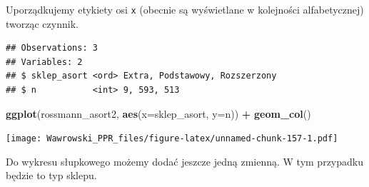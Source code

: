 \documentclass[]{book}
\newenvironment{Shaded}{\begin{snugshade}}{\end{snugshade}}
\newcommand{\KeywordTok}[1]{\textcolor[rgb]{0.13,0.29,0.53}{\textbf{#1}}}
\newcommand{\DataTypeTok}[1]{\textcolor[rgb]{0.13,0.29,0.53}{#1}}
\newcommand{\StringTok}[1]{\textcolor[rgb]{0.31,0.60,0.02}{#1}}
\newcommand{\OperatorTok}[1]{\textcolor[rgb]{0.81,0.36,0.00}{\textbf{#1}}}
\newcommand{\NormalTok}[1]{#1}
\begin{document}
Uporządkujemy etykiety osi \texttt{x} (obecnie są wyświetlane w
kolejności alfabetycznej) tworząc czynnik.

\begin{Shaded}
\end{Shaded}

\begin{verbatim}
## Observations: 3
## Variables: 2
## $ sklep_asort <ord> Extra, Podstawowy, Rozszerzony
## $ n           <int> 9, 593, 513
\end{verbatim}

\begin{Shaded}
\begin{Highlighting}[]
\KeywordTok{ggplot}\NormalTok{(rossmann_asort2, }\KeywordTok{aes}\NormalTok{(}\DataTypeTok{x=}\NormalTok{sklep_asort, }\DataTypeTok{y=}\NormalTok{n)) }\OperatorTok{+}
\StringTok{  }\KeywordTok{geom_col}\NormalTok{()}
\end{Highlighting}
\end{Shaded}

\texttt{[image: Wawrowski\_PPR\_files/figure-latex/unnamed-chunk-157-1.pdf]}

Do wykresu słupkowego możemy dodać jeszcze jedną zmienną. W tym
przypadku będzie to typ sklepu.

\begin{Shaded}
\end{Shaded}
\end{document}
